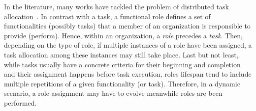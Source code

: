 %
%	
%	
%	





%
%	
%	
%	
%	  

In the literature, many works have tackled the problem of distributed task allocation~\cite{DTA}. In contrast with a task, a functional role defines a set of functionalities (possibly tasks) that a member of an organization is responsible to provide (perform). Hence, within an organization, a \textit{role} precedes a \textit{task}. Then, depending on the type of role, if multiple instances of a role have been assigned, a task allocation among these instances may still take place. Last but not least, while tasks usually have a concrete criteria for their beginning and completion and their assignment happens before task execution, roles lifespan tend to include multiple repetitions of a given functionality (or task). Therefore, in a dynamic scenario, a role assignment may have to evolve meanwhile roles are been performed.

